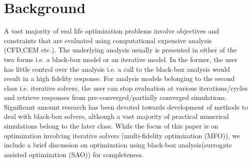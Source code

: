 \section{Background}\label{sec:related}

A vast majority of real life optimization problems involve objectives and constraints that are evaluated using computational expensive analysis (CFD,CEM etc.). The underlying analysis usually is presented in either of the two forms i.e. a black-box model or an iterative model. In the former, the user has little control over the analysis i.e. a call to the black-box analysis would result in a high fidelity response. For analysis models belonging to the second class i.e. iterative solvers, the user can stop evaluation at various iterations/cycles and retrieve responses from pre-converged/partially converged simulations. Significant amount research has been devoted towards development of methods to deal with black-box solvers, although a vast majority of practical numerical simulations belong to the later class. While the focus of this paper is on optimization involving iterative solvers (multi-fidelity optimization (MFO)), we include a brief discussion on optimization using black-box analysis(surrogate assisted optimization (SAO)) for completeness.     

